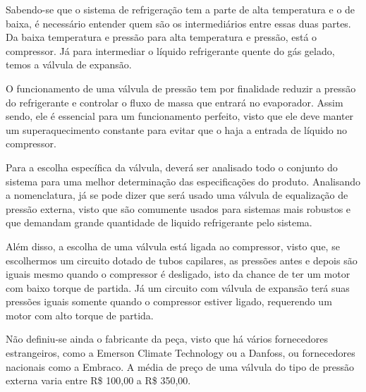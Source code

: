 Sabendo-se que o sistema de refrigeração tem a parte de alta temperatura e o de baixa, é necessário entender quem são os intermediários entre essas duas partes. Da baixa temperatura e pressão para alta temperatura e pressão, está o compressor. Já para intermediar o líquido refrigerante quente do gás gelado, temos a válvula de expansão. 

O funcionamento de uma válvula de pressão tem por finalidade reduzir a pressão do refrigerante e controlar o fluxo de massa que entrará no evaporador. Assim sendo, ele é essencial para um funcionamento perfeito, visto que ele deve manter um superaquecimento constante para evitar que o haja a entrada de líquido no compressor. 

Para a escolha específica da válvula, deverá ser analisado todo o conjunto do sistema para uma melhor determinação das especificações do produto. Analisando a nomenclatura, já se pode dizer que será usado uma válvula de equalização de pressão externa, visto que são comumente usados para sistemas mais robustos e que demandam grande quantidade de liquido refrigerante pelo sistema\cite{compressors_for_refrigeration}. 

Além disso, a escolha de uma válvula está ligada ao compressor, visto que, se escolhermos um circuito dotado de tubos capilares, as pressões antes e depois são iguais mesmo quando o compressor é desligado, isto da chance de ter um motor com baixo torque de partida. Já um circuito com válvula de expansão terá suas pressões iguais somente quando o compressor estiver ligado, requerendo um motor com alto torque de partida\cite{embracovalvula}. 

Não definiu-se ainda o fabricante da peça, visto que há vários fornecedores estrangeiros, como a Emerson Climate Technology ou a Danfoss, ou fornecedores nacionais como a Embraco. A média de preço de uma válvula do tipo de pressão externa varia entre R\$ 100,00 a R\$ 350,00.
    